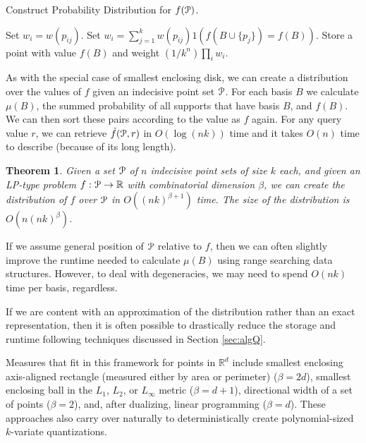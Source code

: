 \documentclass{journal}
\newcommand{\Eu}[1]{\ensuremath{\EuScript{#1}}}
\newcommand{\R}{\ensuremath{\mathbb{R}}}
\newcommand{\psets}{supports\xspace}
\newtheorem {theorem}{Theorem}[section]
\begin{document}
\begin{algorithm}[h!!t]
\caption{\label{alg:count-prob}Construct Probability Distribution for $f(\Eu P)$.}
\begin{algorithmic}[1]
\FOR {all potential bases $B \subset Q \Subset \Eu P$}
      \STATE Set $w_i = w(p_{ij})$.
    \ELSE
      \STATE Set $w_i = \sum_{j=1}^k w(p_{ij}) 1(f(B \cup \{p_j\}) = f(B))$.
    \ENDIF
  \ENDFOR
  \STATE Store a point with value $f(B)$ and weight $(1/k^n) \prod_i w_i$.
\ENDFOR
\end{algorithmic}
\end{algorithm}

As with the special case of smallest enclosing disk, we can create a distribution over the values of $f$ given an indecisive point set $\Eu P$.  For each basis $B$ we calculate $\mu(B)$, the summed probability of all \psets that have basis $B$, and $f(B)$. We can then sort these pairs according to the value as $f$ again.
For any query value $r$, we can retrieve $\tilde f(\Eu P, r)$ in $O(\log (nk))$ time and it takes $O(n)$ time to describe (because of its long length).

\begin{theorem}
Given a set $\Eu P$ of $n$ indecisive point sets of size $k$ each, and given an LP-type problem $f : \Eu P \to \R$ with combinatorial dimension $\beta$, we can create the distribution of $f$ over $\Eu P$ in $O((nk)^{\beta+1})$ time.  The size of the distribution is $O(n (nk)^\beta)$.
\label{thm:gen-comb-dist}
\end{theorem}

If we assume general position of $\Eu P$ relative to $f$, then we can often slightly improve the runtime needed to calculate $\mu(B)$ using range searching data structures.  However, to deal with degeneracies, we may need to spend $O(nk)$ time per basis, regardless.

If we are content with an approximation of the distribution rather than an exact representation, then it is often possible to drastically reduce the storage and runtime following techniques discussed in Section \ref{sec:algQ}.  

Measures that fit in this framework for points in $\R^d$ include smallest enclosing axis-aligned rectangle (measured either by area or perimeter) ($\beta = 2d$), smallest enclosing ball in the $L_1$, $L_2$, or $L_\infty$ metric ($\beta = d+1$), directional width of a set of points ($\beta = 2$), and, after dualizing, linear programming ($\beta = d$).
These approaches also carry over naturally to deterministically create polynomial-sized $k$-variate quantizations.  
\end{document}
